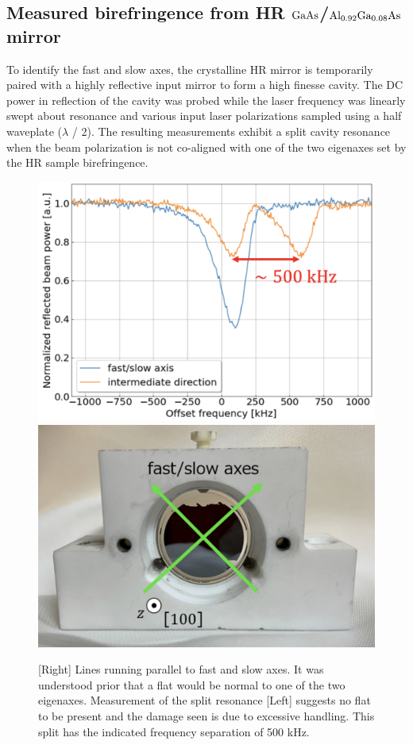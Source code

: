 


\subsection{Measured birefringence from HR \texorpdfstring{$\mathrm{GaAs}$}{gaas}/\texorpdfstring{$\mathrm{Al_{0.92}Ga_{0.08}As}$}{algaas} mirror}

To identify the fast and slow axes, the crystalline HR mirror is temporarily paired with a highly reflective input mirror to form a high finesse cavity. The DC power in reflection of the cavity was probed while the laser frequency was linearly swept about resonance and various input laser polarizations sampled using a half waveplate ($\lambda$ / 2). The resulting measurements exhibit a split cavity resonance when the beam polarization is not co-aligned with one of the two eigenaxes set by the HR sample birefringence.

\begin{figure}[!ht]
    \begin{subcaptiongroup}
	    \includegraphics[width=.485\textwidth]{figs/ALGAAS/split_resonance.png}
	    \label{splitresonance}
	    \includegraphics[width=.52\textwidth]{figs/ALGAAS/fas_axes.png}
	    \label{fasaxes}
    \end{subcaptiongroup}
    \caption{[Right] Lines running parallel to fast and slow axes. It was understood prior that a flat would be normal to one of the two eigenaxes. Measurement of the split resonance [Left] suggests no flat to be present and the damage seen is due to excessive handling. This split has the indicated frequency separation of 500 kHz.}
    \label{fig:split_cav_resonance}
\end{figure}

